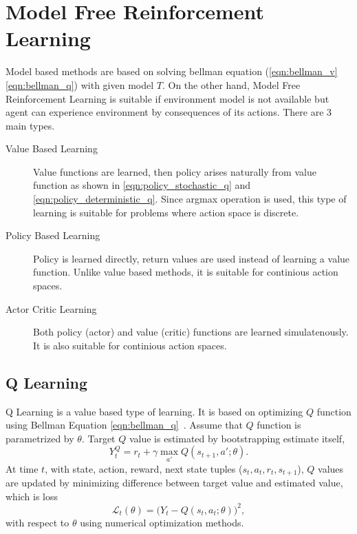 \section{Model Free Reinforcement Learning}
\label{sec:mf_rl}
Model based methods are based on solving bellman equation (\eqref{eqn:bellman_v} \eqref{eqn:bellman_q}) with given model $T$. 
On the other hand, Model Free Reinforcement Learning is suitable 
if environment model is not available but agent can experience environment by consequences of its actions. There are 3 main types. 

\begin{description}
	\item[Value Based Learning] Value functions are learned, 
	then policy arises naturally from value function as shown in \eqref{eqn:policy_stochastic_q} and \eqref{eqn:policy_deterministic_q}. 
	Since argmax operation is used, this type of learning is suitable for problems where action space is discrete. 
	
	\item[Policy Based Learning] Policy is learned directly, 
	return values are used instead of learning a value function. 
	Unlike value based methods, it is suitable for continious action spaces. 
	
	\item[Actor Critic Learning] Both policy (actor) and value (critic) functions are learned simulatenously. 
	It is also suitable for continious action spaces. 
	
\end{description}

\subsection{Q Learning}
Q Learning is a value based type of learning. 
It is based on optimizing $Q$ function using Bellman Equation \eqref{eqn:bellman_q}~\cite{watkins_technical_1992}. 
Assume that $Q$ function is parametrized by $\theta$. 
Target $Q$ value is estimated by bootstrapping estimate itself, 
\begin{equation}
\label{eqn:q_target}
Y_t^Q = r_t + \gamma \max_{a'} Q(s_{t+1},a';\theta).
\end{equation}
At time $t$,  with state, action, reward, next state tuples ($s_t,a_t,r_t,s_{t+1}$), 
$Q$ values are updated by minimizing difference between target value and estimated value, which is loss 
\begin{equation}
\label{eqn:q_loss}
\mathcal{L}_t(\theta) = \big( Y_t - Q(s_t,a_t;\theta) \big) ^ 2, 
\end{equation}
with respect to $\theta$ using numerical optimization methods. 

